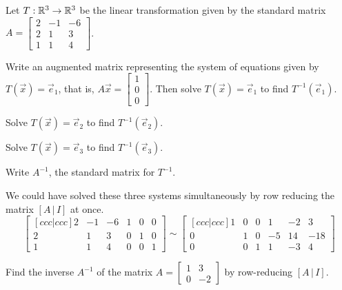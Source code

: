\begin{activity}{20}
  Let \(T: \mathbb{R}^3 \rightarrow \mathbb{R}^3\) be the linear transformation given by the standard matrix
  \(A=\begin{bmatrix} 2 & -1 & -6 \\ 2 & 1 & 3 \\ 1 & 1 & 4 \end{bmatrix}\).
  \begin{subactivity}
  Write an augmented matrix representing the system of equations given by \(T(\vec x)=\vec{e}_1\),
  that is, \(A\vec x=\begin{bmatrix}1 \\ 0 \\ 0 \end{bmatrix}\).
  Then solve \(T(\vec x)=\vec{e}_1\) to find \(T^{-1}(\vec{e}_1)\).
  \end{subactivity}
  \begin{subactivity}
   Solve \(T(\vec x)=\vec{e}_2\) to find \(T^{-1}(\vec{e}_2)\).
  \end{subactivity}
  \begin{subactivity}
   Solve \(T(\vec x)=\vec{e}_3\) to find \(T^{-1}(\vec{e}_3)\).
  \end{subactivity}
  \begin{subactivity}
   Write \(A^{-1}\), the standard matrix for \(T^{-1}\).
  \end{subactivity}
\end{activity}

\begin{observation}
We could have solved these three systems simultaneously
by row reducing the matrix \([A\,|\,I]\) at once.
\[
  \begin{bmatrix}[ccc|ccc]
    2 & -1 & -6 & 1 & 0 & 0 \\
    2 & 1 & 3 & 0 & 1 & 0 \\
    1 & 1 & 4 & 0 & 0 & 1
  \end{bmatrix} \sim
  \begin{bmatrix}[ccc|ccc]
    1 & 0 & 0 & 1 & -2 & 3 \\
    0 & 1 & 0 & -5 & 14 & -18 \\
    0 & 0 & 1 & 1 & -3 & 4
  \end{bmatrix}
\]
\end{observation}


\begin{activity}{5}
  Find the inverse \(A^{-1}\) of the matrix
  \(A=\begin{bmatrix} 1 & 3 \\ 0 & -2 \end{bmatrix}\)
  by row-reducing \([A\,|\,I]\).
\end{activity}


